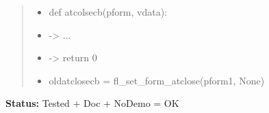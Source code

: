 \begin{boxedminipage}{\funcwidth}
\begin{quote}
\begin{itemize}
  \item
    \setlength{\parskip}{0.6ex}
def atcolsecb(pform, vdata):



  \item {\textbar}-{\textgreater}{\textbar} ...



  \item {\textbar}-{\textgreater}{\textbar} return 0



  \item oldatclosecb = fl\_set\_form\_atclose(pform1, None)



\end{itemize}

\end{quote}

\textbf{Status:} Tested + Doc + NoDemo = OK



    \end{boxedminipage}

    \label{xformslib:flbasic:fl_set_atclose}

    \vspace{0.5ex}

